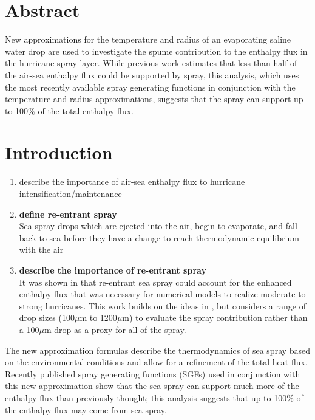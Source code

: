 \documentclass[10pt,a4paper]{article}
\begin{document}
 \renewcommand{\theenumi}{\Roman{enumi}}
 \renewcommand{\theenumii}{\arabic{enumii}}
 \renewcommand{\theenumiii}{\alpha{enumiii}}

\section{Abstract}
\large

New approximations for the temperature and radius of an evaporating saline water drop are used to investigate the spume contribution to the enthalpy flux in the hurricane spray layer. While previous work estimates that less than half of the air-sea enthalpy flux could be supported by spray, this analysis, which uses the most recently available spray generating functions in conjunction with the temperature and radius approximations, suggests that the spray can support up to 100\% of the total enthalpy flux.

\section{Introduction}
\begin{enumerate}
\item describe the importance of air-sea enthalpy flux to hurricane intensification/maintenance 
\item \textbf{define re-entrant spray}\\
Sea spray drops which are ejected into the air, begin to evaporate, and fall back to sea before they have a change to reach thermodynamic equilibrium with the air 
\item \textbf{describe the importance of re-entrant spray}\\
It was shown in \citet{Andreas2001} that re-entrant sea spray could account for the enhanced enthalpy flux that was necessary for numerical models to realize moderate to strong hurricanes. This work builds on the ideas in \citet{Andreas2001}, but considers a range of drop sizes (100$\mu$m to 1200$\mu$m) to evaluate the spray contribution rather than a 100$\mu$m drop as a proxy for all of the spray.
\end{enumerate}

The new approximation formulas describe the thermodynamics of sea spray based on the environmental conditions and allow for a refinement of the total heat flux. Recently published spray generating functions (SGFs) used in conjunction with this new approximation show that the sea spray can support much more of the enthalpy flux than previously thought; this analysis suggests that up to 100\% of the enthalpy flux may come from sea spray.
\end{document}
